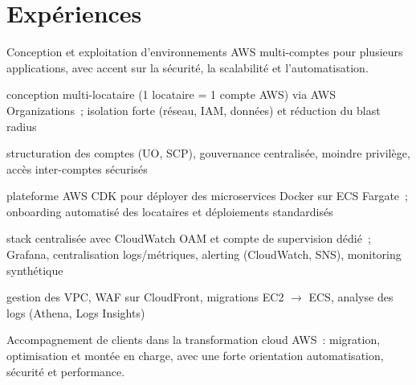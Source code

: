 \section*{Exp\'eriences}


Conception et exploitation d'environnements AWS multi-comptes pour plusieurs applications, avec accent sur la s\'ecurit\'e, la scalabilit\'e et l'automatisation.

\begin{cvitemize}
  \item {} conception multi-locataire (1 locataire = 1 compte AWS) via AWS Organizations~; isolation forte (r\'eseau, IAM, donn\'ees) et r\'eduction du blast radius
  \item {} structuration des comptes (UO, SCP), gouvernance centralis\'ee, moindre privil\`ege, acc\`es inter-comptes s\'ecuris\'es
  \item {} plateforme AWS CDK pour d\'eployer des microservices Docker sur ECS Fargate~; onboarding automatis\'e des locataires et d\'eploiements standardis\'es
  \item {} stack centralis\'ee avec CloudWatch OAM et compte de supervision d\'edi\'e~; Grafana, centralisation logs/m\'etriques, alerting (CloudWatch, SNS), monitoring synth\'etique
  \item {} gestion des VPC, WAF sur CloudFront, migrations EC2 $\rightarrow$ ECS, analyse des logs (Athena, Logs Insights)
\end{cvitemize}

\cvJobSeparator


Accompagnement de clients dans la transformation cloud AWS~: migration, optimisation et mont\'ee en charge, avec une forte orientation automatisation, s\'ecurit\'e et performance.

